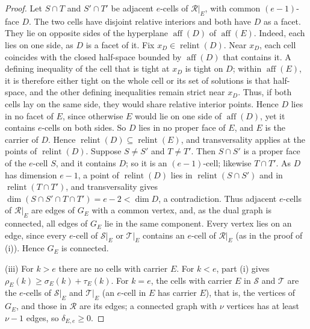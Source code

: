 \documentclass[11pt]{article}
\theoremstyle{definition}
\theoremstyle{remark}
\newcommand{\SSS}{\mathcal S}
\newcommand{\TT}{\mathcal T}
\newcommand{\RR}{\mathcal R}
\newcommand{\relint}{\operatorname{relint}}
\newcommand{\aff}{\operatorname{aff}}
\begin{document}
\begin{proof}
Let $S\cap T$ and $S'\cap T'$ be adjacent $e$-cells of
$\RR|_E$, with common $(e-1)$-face $D$. The two cells have disjoint relative interiors and both
have $D$ as a facet. They lie on opposite sides of the hyperplane $\aff(D)$ of $\aff(E)$. Indeed, each lies on one
side, as $D$ is a facet of it. Fix $x_D\in\relint(D)$. Near $x_D$, each cell coincides with the closed half-space bounded by $\aff(D)$ that contains it. A defining inequality of the cell that is tight at $x_D$ is tight on $D$; within $\aff(E)$, it is therefore either tight on the whole cell or its set of solutions is that half-space, and the other defining inequalities remain strict near $x_D$. Thus, if both cells lay on the same side, they would share relative interior points. Hence $D$ lies in no facet of $E$, since otherwise $E$ would lie on one side of $\aff(D)$, yet it contains $e$-cells on both sides. So $D$ lies in no proper face of $E$, and $E$ is the carrier of $D$. Hence $\relint(D)\subseteq\relint(E)$, and transversality applies at the points of $\relint(D)$.
Suppose $S\neq S'$ and $T\neq T'$. Then $S\cap S'$ is a proper face of the $e$-cell $S$, and it contains $D$; so it is an $(e-1)$-cell; likewise $T\cap T'$. As $D$ has dimension $e-1$, a point
of $\relint(D)$ lies in $\relint(S\cap S')$ and in $\relint(T\cap T')$,
and transversality gives $\dim(S\cap S'\cap T\cap T')=e-2<\dim D$, a
contradiction. Thus adjacent $e$-cells of $\RR|_E$ are edges of $G_E$
with a common vertex, and, as the dual graph is connected, all edges of
$G_E$ lie in the same component. Every vertex lies on an edge, since every
$e$-cell of $\SSS|_E$ or $\TT|_E$ contains an $e$-cell of $\RR|_E$ (as in the proof of (i)).
Hence $G_E$ is connected.

(iii) For $k>e$ there are no cells with carrier $E$. For $k<e$, part (i) gives $\rho_E(k)\geq\sigma_E(k)+\tau_E(k)$. For $k=e$, the cells with
carrier $E$ in $\SSS$ and $\TT$ are the $e$-cells of $\SSS|_E$ and $\TT|_E$ (an $e$-cell in $E$ has
carrier $E$), that is, the vertices of $G_E$, and those in
$\RR$ are its edges; a connected graph with $\nu$ vertices has at least $\nu-1$ edges,
so $\delta_{E,e}\geq0$.
\end{proof}
\end{document}
